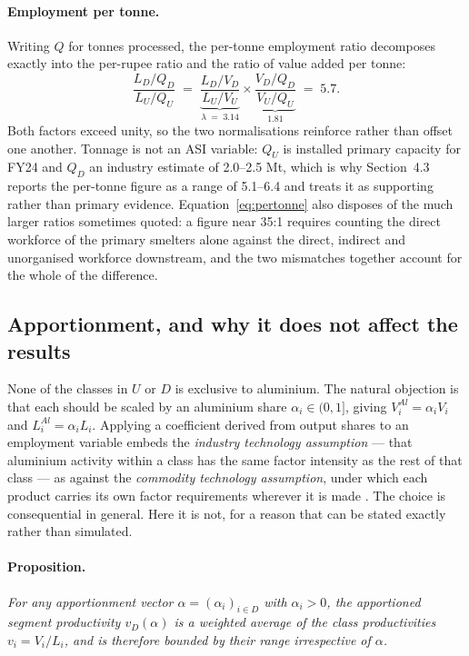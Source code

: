 \documentclass[11pt, a4paper]{article}
\numberwithin{figure}{section}
\numberwithin{table}{section}
\begin{document}
\paragraph{Employment per tonne.} Writing $Q$ for tonnes processed, the per-tonne
employment ratio decomposes exactly into the per-rupee ratio and the ratio of value
added per tonne:
\begin{equation}
    \frac{L_D/Q_D}{L_U/Q_U}
    \;=\;
    \underbrace{\frac{L_D/V_D}{L_U/V_U}}_{\lambda \;=\; 3.14}
    \times
    \underbrace{\frac{V_D/Q_D}{V_U/Q_U}}_{1.81}
    \;=\; 5.7 .
    \label{eq:pertonne}
\end{equation}
Both factors exceed unity, so the two normalisations reinforce rather than offset one
another. Tonnage is not an ASI variable: $Q_U$ is installed primary capacity for FY24
and $Q_D$ an industry estimate of 2.0--2.5 Mt, which is why Section~4.3 reports the
per-tonne figure as a range of 5.1--6.4 and treats it as supporting rather than
primary evidence. Equation~\eqref{eq:pertonne} also disposes of the much larger
ratios sometimes quoted: a figure near 35:1 requires counting the direct workforce of
the primary smelters alone against the direct, indirect and unorganised workforce
downstream, and the two mismatches together account for the whole of the difference.

\subsection{Apportionment, and why it does not affect the results}
\label{app:asi_alpha}

None of the classes in $U$ or $D$ is exclusive to aluminium. The natural objection
is that each should be scaled by an aluminium share $\alpha_i \in (0,1]$, giving
$V^{Al}_{i} = \alpha_i V_{i}$ and $L^{Al}_{i} = \alpha_i L_{i}$. Applying a
coefficient derived from output shares to an employment variable embeds the
\emph{industry technology assumption} --- that aluminium activity within a class has
the same factor intensity as the rest of that class --- as against the
\emph{commodity technology assumption}, under which each product carries its own
factor requirements wherever it is made \cite{millerblair}. The choice is
consequential in general. Here it is not, for a reason that can be stated exactly
rather than simulated.

\paragraph{Proposition.} \textit{For any apportionment vector
$\alpha = (\alpha_i)_{i \in D}$ with $\alpha_i > 0$, the apportioned segment
productivity $v_D(\alpha)$ is a weighted average of the class productivities
$v_i = V_i / L_i$, and is therefore bounded by their range irrespective of
$\alpha$.}
\end{document}
